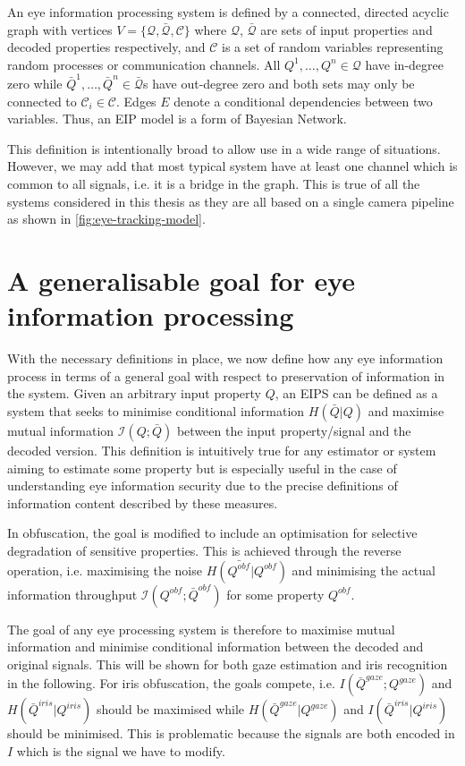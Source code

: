 An eye information processing system is defined by a connected, directed acyclic graph with vertices $V=\{\mathcal{Q}, \bar{\mathcal{Q}}, \mathcal{C}\}$ where $\mathcal{Q}$, $\bar{\mathcal{Q}}$ are sets of input properties and decoded properties respectively, and $\mathcal{C}$ is a set of random variables representing random processes or communication channels. All $Q^1, \dots, Q^n \in \mathcal{Q}$ have in-degree zero  while $\bar{Q}^1, \dots, \bar{Q}^n \in \bar{\mathcal{Q}}$s have out-degree zero and both sets may only be connected to $\mathcal{C}_i \in \mathcal{C}$. Edges $E$ denote a conditional dependencies between two variables. Thus, an EIP model is a form of Bayesian Network.

This definition is intentionally broad to allow use in a wide range of situations. However, we may add that most typical system have at least one channel which is common to all signals, i.e. it is a bridge in the graph. This is true of all the systems considered in this thesis as they are all based on a single camera pipeline as shown in \cref{fig:eye-tracking-model}.



\section{A generalisable goal for eye information processing}\label{sec:gen-goals}
With the necessary definitions in place, we now define how any eye information process in terms of a general goal with respect to preservation of information in the system. Given an arbitrary input property $Q$, an EIPS can be defined as a system that seeks to minimise conditional information $H(\bar{Q}|Q)$ and maximise mutual information $\mathcal{I}(Q;\bar{Q})$ between the input property/signal and the decoded version. This definition is intuitively true for any estimator or system aiming to estimate some property but is especially useful in the case of understanding eye information security due to the precise definitions of information content described by these measures.

In obfuscation, the goal is modified to include an optimisation for selective degradation of sensitive properties. This is achieved through the reverse operation, i.e. maximising the noise $H(\bar{Q^{obf}}|Q^{obf})$ and minimising the actual information throughput $\mathcal{I}(Q^{obf};\bar{Q}^{obf})$ for some property $Q^{obf}$. 

The goal of any eye processing system is therefore to maximise mutual information and minimise conditional information between the decoded and original signals. This will be shown for both gaze estimation and iris recognition in the following. For iris obfuscation, the goals compete, i.e. $I(\bar{Q}^{gaze};Q^{gaze})$ and $H(\bar{Q}^{iris}|Q^{iris})$ should be maximised while $H(\bar{Q}^{gaze}|Q^{gaze})$ and $I(\bar{Q}^{iris}|Q^{iris})$ should be minimised. This is problematic because the signals are both encoded in $I$ which is the signal we have to modify. 

